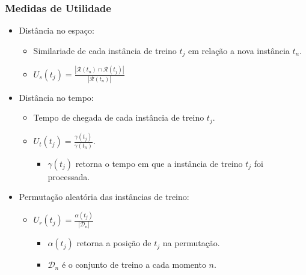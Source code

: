 \documentclass[14pt]{beamer}
\begin{document}
\begin{frame}\frametitle{Medidas de Utilidade}
\begin{itemize}
\item Distância no espaço:
\begin{itemize}
\item Similariade de cada instância de treino $t_j$ em relação a nova instância $t_n$.
\item $U_s(t_j)=\frac{|\mathcal{R}(t_n) \cap \mathcal{R}(t_j)|}{|\mathcal{R}(t_n)|}$
\end{itemize}
\item Distância no tempo:
\begin{itemize}
\item Tempo de chegada de cada instância de treino $t_j$.
\item $U_t(t_j)=\frac{\gamma(t_j)}{\gamma(t_n)}$.
\begin{itemize}
\item $\gamma(t_j)$ retorna o tempo em que a instância de treino $t_j$ foi processada.
\end{itemize}
\end{itemize}
\item Permutação aleatória das instâncias de treino:
\begin{itemize}
\item $U_r(t_j)=\frac{\alpha(t_j)}{|\mathcal{D}_n|}$
\begin{itemize}
\item $\alpha(t_j)$ retorna a posição de $t_j$ na permutação.
\item $\mathcal{D}_n$ é o conjunto de treino a cada momento $n$.
\end{itemize}
\end{itemize}
\end{itemize}

\end{frame}
\end{document}
